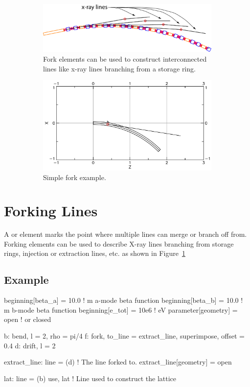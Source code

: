 \documentclass{hitec}
\newcommand{\Section}[1]{\section{#1}\vspace*{-1ex}}
\begin{document}
\begin{figure}[tb]
  \centering
  \begin{subfigure}[b]{0.48\textwidth}
    \includegraphics[width=\textwidth]{x-fork.pdf}
    \caption{Fork elements can be used to construct interconnected lines like x-ray lines branching
      from a storage ring.}
    \label{f:fork}
  \end{subfigure}
  \hfil
  \begin{subfigure}[b]{0.48\textwidth}
    \includegraphics[width=\textwidth]{fork-example.pdf}
    \caption{Simple fork example.}
    \label{f:fork.example}
  \end{subfigure}
  \caption{}
\end{figure}

\Section{Forking Lines}

A  or  element marks the point where multiple lines can merge or branch off from.
Forking elements can be used to describe X-ray lines branching from storage rings, injection or
extraction lines, etc. as shown in Figure~\ref{f:fork}

\subsection{Example}

\begin{code}
beginning[beta_a] = 10.0        ! m  a-mode beta function
beginning[beta_b] = 10.0        ! m  b-mode beta function
beginning[e_tot] = 10e6         ! eV 
parameter[geometry] = open      ! or closed

b: bend, l = 2, rho = pi/4
f: fork, to_line = extract_line, superimpose, offset = 0.4
d: drift, l = 2

extract_line: line = (d)       ! The line forked to.
extract_line[geometry] = open

lat: line = (b)
use, lat                ! Line used to construct the lattice
\end{code}
\end{document}
